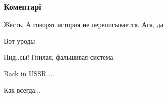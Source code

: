  
 
 
 
 
\subsubsection{Коментарі}

\begin{itemize}
 
Жесть. А говорят история не переписывается. Ага, да

 
Вот уроды

 
Пид..сы! Гнилая, фальшивая система.

 
Back in USSR ...

 
Как всегда...


\end{itemize}
